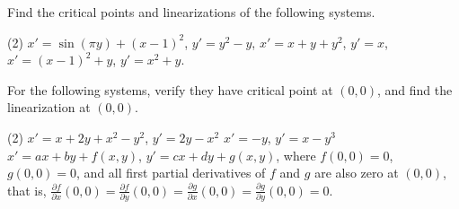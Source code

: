 \documentclass{ximera}
\begin{document}
\begin{exercise}%
    Find the critical points and linearizations of the following systems.
    \begin{tasks}(2)
        \task $x'=\sin(\pi y)+(x-1)^2$, \enspace $y'=y^2-y$,
        \task $x'=x+y+y^2$, \enspace $y'=x$,
        \task $x'=(x-1)^2+y$, \enspace $y'=x^2+y$.
    \end{tasks}
\end{exercise}

\begin{exercise}
    For the following systems, verify they have critical point at $(0,0)$, and find the linearization at $(0,0)$.
    \begin{tasks}(2)
        \task $x'=x+2y+x^2-y^2$, \enspace $y'=2y-x^2$
        \task $x'=-y$, \enspace $y'=x-y^3$
        \task* $x'=ax+by+f(x,y)$, $y'=cx+dy+g(x,y)$, where
            $f(0,0) = 0$, $g(0,0) = 0$, 
            and all first partial derivatives of $f$ and $g$ are also zero at $(0,0)$, that is,
            $\frac{\partial f}{\partial x}(0,0) = \frac{\partial f}{\partial y}(0,0) = \frac{\partial g}{\partial x}(0,0) = \frac{\partial g}{\partial y}(0,0) = 0$.
    \end{tasks}
\end{exercise}
\end{document}
